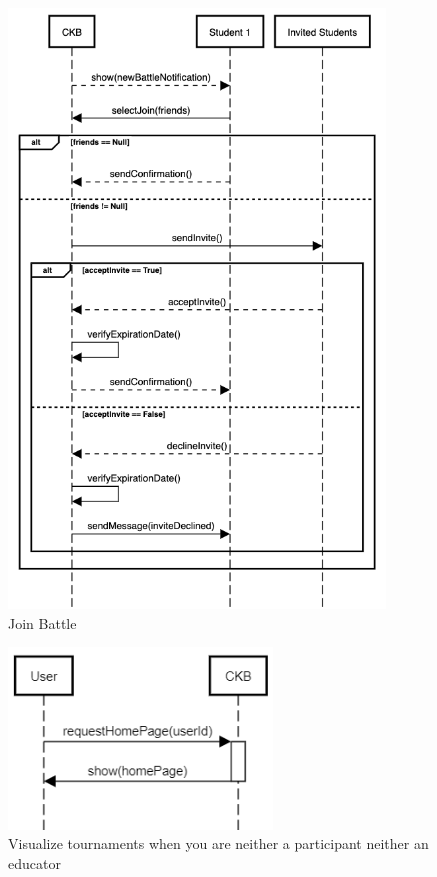 \documentclass{article}
\begin{document}
            \begin{figure}[!ht]
                \centering
                \includegraphics[width=10cm]{LaudiziMarusicMassarelli/RASD/joinBalltle.png}
                \caption{Join Battle}
                \label{fig:join Battle}
            \end{figure}
            

\begin{figure}[!ht]
    \centering
    \includegraphics[width=7cm]{LaudiziMarusicMassarelli/RASD/VisualizeTournaments (1).png}
    \caption{Visualize tournaments when you are neither a participant neither an educator}
    \label{fig:Visualize tournaments when you are neither a participant neither an educator}
\end{figure}
\end{document}
